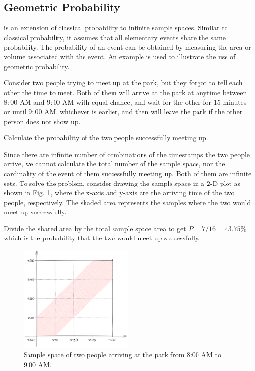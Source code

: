 \subsection{Geometric Probability}

 is an extension of classical probability to infinite sample spaces. Similar to classical probability, it assumes that all elementary events share the same probability. The probability of an event can be obtained by measuring the area or volume associated with the event. An example is used to illustrate the use of geometric probability.

\begin{shortbox}
Consider two people trying to meet up at the park, but they forgot to tell each other the time to meet. Both of them will arrive at the park at anytime between $8:00$ AM and $9:00$ AM with equal chance, and wait for the other for 15 minutes or until $9:00$ AM, whichever is earlier, and then will leave the park if the other person does not show up.

Calculate the probability of the two people successfully meeting up.

\end{shortbox}

Since there are infinite number of combinations of the timestamps the two people arrive, we cannot calculate the total number of the sample space, nor the cardinality of the event of them successfully meeting up. Both of them are infinite sets. To solve the problem, consider drawing the sample space in a 2-D plot as shown in Fig. \ref{fig:geometricprobexp}, where the x-axis and y-axis are the arriving time of the two people, respectively. The shaded area represents the samples where the two would meet up successfully.

Divide the shared area by the total sample space area to get $P=7/16=43.75\%$ which is the probability that the two would meet up successfully.

\begin{figure}[!htb]
	\centering
	\includegraphics[width=0.5\textwidth]{chapters/part-1/figures/geometricprobexp.png}
	\caption{Sample space of two people arriving at the park from 8:00 AM to 9:00 AM.} \label{fig:geometricprobexp}
\end{figure}

